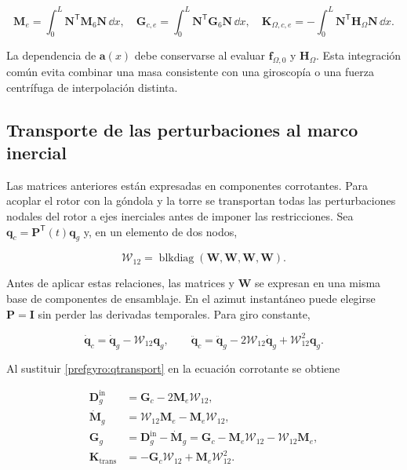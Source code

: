 \begin{equation}
 \bm M_e=\int_0^L\bm N^{\mathsf T}\bm M_6\bm N\,\dd x,
 \quad
 \bm G_{c,e}=\int_0^L\bm N^{\mathsf T}\bm G_6\bm N\,\dd x,
 \quad
 \bm K_{\Omega,c,e}=-\int_0^L
 \bm N^{\mathsf T}\bm H_\Omega\bm N\,\dd x.
 \label{prefgyro:elemento}
\end{equation}

La dependencia de $\bm a(x)$ debe conservarse al evaluar
$\bm f_{\Omega,0}$ y $\bm H_\Omega$. Esta integración común evita combinar una
masa consistente con una giroscopía o una fuerza centrífuga de interpolación
distinta.

\subsection{Transporte de las perturbaciones al marco inercial}
\label{prefgyro:transporte}

Las matrices anteriores están expresadas en componentes corrotantes. Para
acoplar el rotor con la góndola y la torre se transportan todas las
perturbaciones nodales del rotor a ejes inerciales antes de imponer las
restricciones. Sea $\bm q_c=\bm P^{\mathsf T}(t)\bm q_g$ y, en un elemento de
dos nodos,

\begin{equation}
 \bm{\mathcal W}_{12}
 =\operatorname{blkdiag}(\bm W,\bm W,\bm W,\bm W).
 \label{prefgyro:W12}
\end{equation}

Antes de aplicar estas relaciones, las matrices y $\bm W$ se expresan en una misma base de componentes de ensamblaje. En el azimut instantáneo puede elegirse $\bm P=\bm I$ sin perder las derivadas
temporales. Para giro constante,

\begin{equation}
 \dot{\bm q}_c=\dot{\bm q}_g-\bm{\mathcal W}_{12}\bm q_g,
 \qquad
 \ddot{\bm q}_c=\ddot{\bm q}_g
 -2\bm{\mathcal W}_{12}\dot{\bm q}_g
 +\bm{\mathcal W}_{12}^2\bm q_g.
 \label{prefgyro:qtransport}
\end{equation}

Al sustituir \eqref{prefgyro:qtransport} en la ecuación corrotante se obtiene

\begin{align}
 \bm D_g^{\mathrm{in}}&=\bm G_c-2\bm M_e\bm{\mathcal W}_{12},
 \label{prefgyro:Dg-in}\\
 \dot{\bm M}_g&=
 \bm{\mathcal W}_{12}\bm M_e
 -\bm M_e\bm{\mathcal W}_{12},
 \label{prefgyro:Mdot}\\
 \bm G_g&=\bm D_g^{\mathrm{in}}-\dot{\bm M}_g
 =\bm G_c-\bm M_e\bm{\mathcal W}_{12}
 -\bm{\mathcal W}_{12}\bm M_e,
 \label{prefgyro:Gg}\\
 \bm K_{\mathrm{trans}}&=
 -\bm G_c\bm{\mathcal W}_{12}
 +\bm M_e\bm{\mathcal W}_{12}^2.
 \label{prefgyro:Ktransport}
\end{align}

